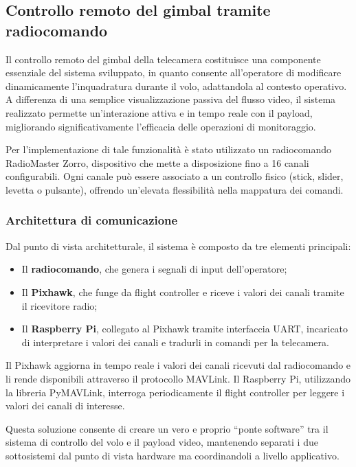\noindent 

\bigskip

\subsection{Controllo remoto del gimbal tramite radiocomando}

Il controllo remoto del gimbal della telecamera costituisce una componente essenziale del sistema sviluppato, in quanto consente all’operatore di modificare dinamicamente l’inquadratura durante il volo, adattandola al contesto operativo.  
A differenza di una semplice visualizzazione passiva del flusso video, il sistema realizzato permette un’interazione attiva e in tempo reale con il payload, migliorando significativamente l’efficacia delle operazioni di monitoraggio.

Per l’implementazione di tale funzionalità è stato utilizzato un radiocomando RadioMaster Zorro, dispositivo che mette a disposizione fino a 16 canali configurabili. Ogni canale può essere associato a un controllo fisico (stick, slider, levetta o pulsante), offrendo un’elevata flessibilità nella mappatura dei comandi.

\subsubsection{Architettura di comunicazione}

Dal punto di vista architetturale, il sistema è composto da tre elementi principali:

\begin{itemize}
    \item Il \textbf{radiocomando}, che genera i segnali di input dell’operatore;
    \item Il \textbf{Pixhawk}, che funge da flight controller e riceve i valori dei canali tramite il ricevitore radio;
    \item Il \textbf{Raspberry Pi}, collegato al Pixhawk tramite interfaccia UART, incaricato di interpretare i valori dei canali e tradurli in comandi per la telecamera.
\end{itemize}

Il Pixhawk aggiorna in tempo reale i valori dei canali ricevuti dal radiocomando e li rende disponibili attraverso il protocollo MAVLink\cite{mavlink}.  
Il Raspberry Pi, utilizzando la libreria PyMAVLink, interroga periodicamente il flight controller per leggere i valori dei canali di interesse.

Questa soluzione consente di creare un vero e proprio “ponte software” tra il sistema di controllo del volo e il payload video, mantenendo separati i due sottosistemi dal punto di vista hardware ma coordinandoli a livello applicativo.

